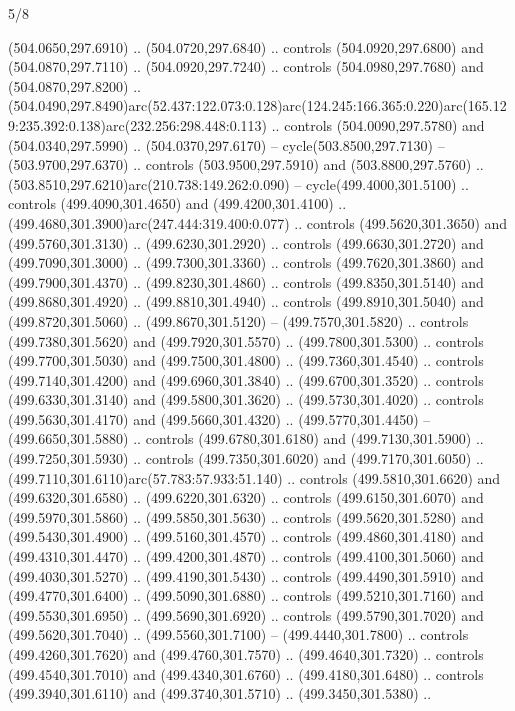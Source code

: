 \begin{flagdescription}{5/8}
\begin{scope}[xshift=0.5\flaglength,yshift=0.5\flagwidth,scale=\flagwidth/475.63]
\begin{scope}[y=0.8pt, x=0.8pt, yscale=-1, xscale=1,shift={(-450,-300)}]
\begin{scope}[cm={{1.0,0.0,0.0,1.0,(-0.0002,0.12556)}},cm={{1.0,0.0,0.0,1.0,(0.00179,0.0)}}]
\begin{scope}[cm={{1.11592,0.0,0.0,1.11592,(-106.89933,-41.77764)}}]
\begin{scope}[draw=black,fill=cfff]
\begin{scope}[fill=black]
  (504.0650,297.6910) .. (504.0720,297.6840) .. controls (504.0920,297.6800) and
  (504.0870,297.7110) .. (504.0920,297.7240) .. controls (504.0980,297.7680) and
  (504.0870,297.8200) ..
  (504.0490,297.8490)arc(52.437:122.073:0.128)arc(124.245:166.365:0.220)arc(165.129:235.392:0.138)arc(232.256:298.448:0.113)
  .. controls (504.0090,297.5780) and (504.0340,297.5990) .. (504.0370,297.6170)
  -- cycle(503.8500,297.7130) -- (503.9700,297.6370) .. controls
  (503.9500,297.5910) and (503.8800,297.5760) ..
  (503.8510,297.6210)arc(210.738:149.262:0.090) -- cycle(499.4000,301.5100) ..
  controls (499.4090,301.4650) and (499.4200,301.4100) ..
  (499.4680,301.3900)arc(247.444:319.400:0.077) .. controls (499.5620,301.3650)
  and (499.5760,301.3130) .. (499.6230,301.2920) .. controls (499.6630,301.2720)
  and (499.7090,301.3000) .. (499.7300,301.3360) .. controls (499.7620,301.3860)
  and (499.7900,301.4370) .. (499.8230,301.4860) .. controls (499.8350,301.5140)
  and (499.8680,301.4920) .. (499.8810,301.4940) .. controls (499.8910,301.5040)
  and (499.8720,301.5060) .. (499.8670,301.5120) -- (499.7570,301.5820) ..
  controls (499.7380,301.5620) and (499.7920,301.5570) .. (499.7800,301.5300) ..
  controls (499.7700,301.5030) and (499.7500,301.4800) .. (499.7360,301.4540) ..
  controls (499.7140,301.4200) and (499.6960,301.3840) .. (499.6700,301.3520) ..
  controls (499.6330,301.3140) and (499.5800,301.3620) .. (499.5730,301.4020) ..
  controls (499.5630,301.4170) and (499.5660,301.4320) .. (499.5770,301.4450) --
  (499.6650,301.5880) .. controls (499.6780,301.6180) and (499.7130,301.5900) ..
  (499.7250,301.5930) .. controls (499.7350,301.6020) and (499.7170,301.6050) ..
  (499.7110,301.6110)arc(57.783:57.933:51.140) .. controls (499.5810,301.6620)
  and (499.6320,301.6580) .. (499.6220,301.6320) .. controls (499.6150,301.6070)
  and (499.5970,301.5860) .. (499.5850,301.5630) .. controls (499.5620,301.5280)
  and (499.5430,301.4900) .. (499.5160,301.4570) .. controls (499.4860,301.4180)
  and (499.4310,301.4470) .. (499.4200,301.4870) .. controls (499.4100,301.5060)
  and (499.4030,301.5270) .. (499.4190,301.5430) .. controls (499.4490,301.5910)
  and (499.4770,301.6400) .. (499.5090,301.6880) .. controls (499.5210,301.7160)
  and (499.5530,301.6950) .. (499.5690,301.6920) .. controls (499.5790,301.7020)
  and (499.5620,301.7040) .. (499.5560,301.7100) -- (499.4440,301.7800) ..
  controls (499.4260,301.7620) and (499.4760,301.7570) .. (499.4640,301.7320) ..
  controls (499.4540,301.7010) and (499.4340,301.6760) .. (499.4180,301.6480) ..
  controls (499.3940,301.6110) and (499.3740,301.5710) .. (499.3450,301.5380) ..

\end{scope}
\end{scope}
\end{scope}
\end{scope}
\end{scope}
\end{scope}
\end{flagdescription}
